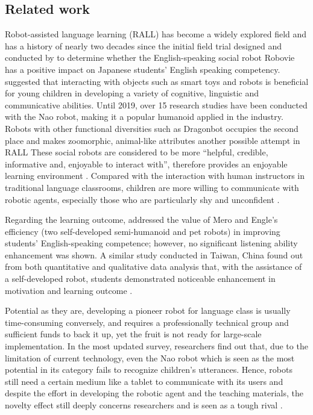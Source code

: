 \documentclass[english]{textolivre}
\begin{document}
\subsection{Related work}\label{sec-normas}
Robot-assisted language learning (RALL) has become a widely explored field and has a history of nearly two decades since the initial field trial designed and conducted by \textcite{kanda_interactive_2004} to determine whether the English-speaking social robot Robovie has a positive impact on Japanese students’ English speaking competency. \textcite{gutierrez_garcia_smart_2017} suggested that interacting with objects such as smart toys and robots is beneficial for young children in developing a variety of cognitive, linguistic and communicative abilities. Until 2019, over 15 research studies have been conducted with the Nao robot, making it a popular humanoid applied in the industry. Robots with other functional diversities such as Dragonbot occupies the second place and makes zoomorphic, animal-like attributes another possible attempt in RALL \cite{van_den_berghe_social_2019, randall_survey_2020} These social robots are considered to be more “helpful, credible, informative and, enjoyable to interact with”, therefore provides an enjoyable learning environment \cite[p. 260]{van_den_berghe_social_2019}. Compared with the interaction with human instructors in traditional language classrooms, children are more willing to communicate with robotic agents, especially those who are particularly shy and unconfident \cite{wu_instructional_2015}.

Regarding the learning outcome, \textcite{lee_cognitive_2010} addressed the value of Mero and Engle’s efficiency (two self-developed semi-humanoid and pet robots) in improving students’ English-speaking competence; however, no significant listening ability enhancement was shown. A similar study conducted in Taiwan, China found out from both quantitative and qualitative data analysis that, with the assistance of a self-developed robot, students demonstrated noticeable enhancement in motivation and learning outcome \cite{wu_instructional_2015}.

Potential as they are, developing a pioneer robot for language class is usually time-consuming conversely, and requires a professionally technical group and sufficient funds to back it up, yet the fruit is not ready for large-scale implementation. In the most updated survey, researchers find out that, due to the limitation of current technology, even the Nao robot which is seen as the most potential in its category fails to recognize children’s utterances. Hence, robots still need a certain medium like a tablet to communicate with its users and despite the effort in developing the robotic agent and the teaching materials, the novelty effect still deeply concerns researchers and is seen as a tough rival \cite{van_den_berghe_social_2019}.
\end{document}
